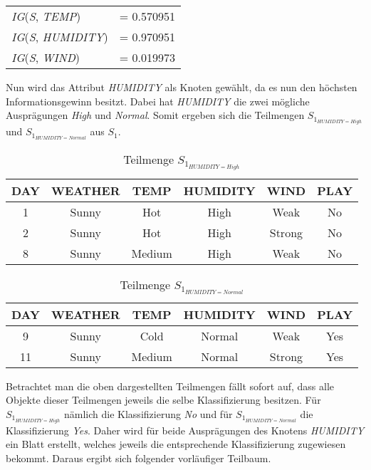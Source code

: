 \begin{table}[htbp]
    \centering
    \begin{tabular}{lc}
        \textit{IG}(\textit{S}, \textit{TEMP})     &= 0.570951 \\
        \textit{IG}(\textit{S}, \textit{HUMIDITY}) &= 0.970951 \\
        \textit{IG}(\textit{S}, \textit{WIND})     &= 0.019973 \\
    \end{tabular}
\end{table}

Nun wird das Attribut \textit{HUMIDITY} als Knoten gewählt, da es nun den höchsten Informationsgewinn besitzt. Dabei hat \textit{HUMIDITY} die zwei mögliche Ausprägungen \textit{High} und \textit{Normal}. Somit ergeben sich die Teilmengen $S_{1_{HUMIDITY=High}}$ und $S_{1_{HUMIDITY=Normal}}$ aus $S_{1}$.

\begin{table}[H]
    \centering
    \begin{tabular}{cccccc}
        \toprule
        \textbf{DAY} & \textbf{WEATHER} & \textbf{TEMP} & \textbf{HUMIDITY} & \textbf{WIND} & \textbf{PLAY} \\
        \toprule
        1   &Sunny	&Hot	&High	&Weak	&No  \\
        2   &Sunny	&Hot	&High	&Strong	&No  \\
        8   &Sunny	&Medium	&High	&Weak	&No  \\
        \bottomrule
    \end{tabular}
    \caption{Teilmenge $S_{1_{HUMIDITY=High}}$}
    \label{table:datensatz-humidity-high}
\end{table}
\begin{table}[H]
    \centering
    \begin{tabular}{cccccc}
        \toprule
        \textbf{DAY} & \textbf{WEATHER} & \textbf{TEMP} & \textbf{HUMIDITY} & \textbf{WIND} & \textbf{PLAY} \\
        \toprule
        9   &Sunny	&Cold	&Normal	&Weak	&Yes \\
        11  &Sunny	&Medium	&Normal	&Strong	&Yes \\
        \bottomrule
    \end{tabular}
    \caption{Teilmenge $S_{1_{HUMIDITY=Normal}}$}
    \label{table:datensatz-humidity-normal}
\end{table}

Betrachtet man die oben dargestellten Teilmengen fällt sofort auf, dass alle Objekte dieser Teilmengen jeweils die selbe Klassifizierung besitzen. Für $S_{1_{HUMIDITY=High}}$ nämlich die Klassifizierung \textit{No} und für $S_{1_{HUMIDITY=Normal}}$ die Klassifizierung \textit{Yes}. Daher wird für beide Ausprägungen des Knotens \textit{HUMIDITY} ein Blatt erstellt, welches jeweils die entsprechende Klassifizierung zugewiesen bekommt. Daraus ergibt sich folgender vorläufiger Teilbaum.

